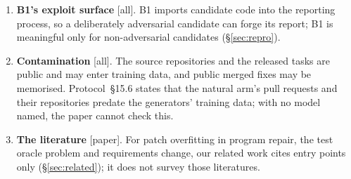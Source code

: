 \begin{enumerate}
\item \textbf{B1's exploit surface} [all]. B1 imports candidate code into the reporting process, so a deliberately adversarial candidate can forge its report; B1 is meaningful only for non-adversarial candidates (\S\ref{sec:repro}).
\item \textbf{Contamination} [all]. The source repositories and the released tasks are public and may enter training data, and public merged fixes may be memorised. Protocol~\S15.6 states that the natural arm's pull requests and their repositories predate the generators' training data; with no model named, the paper cannot check this.
\item \textbf{The literature} [paper]. For patch overfitting in program repair, the test oracle problem and requirements change, our related work cites entry points only (\S\ref{sec:related}); it does not survey those literatures.
\end{enumerate}
